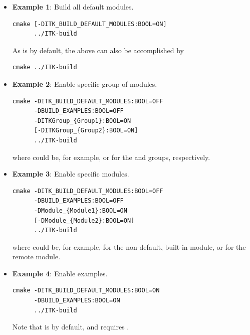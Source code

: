 \begin{itemize}
\item \textbf{Example 1}: Build all default modules.
\small
\begin{verbatim}
cmake [-DITK_BUILD_DEFAULT_MODULES:BOOL=ON]
      ../ITK-build
\end{verbatim}
\normalsize

As  is  by default, the above can
also be accomplished by
\begin{verbatim}
cmake ../ITK-build
\end{verbatim}

\item \textbf{Example 2}: Enable specific group of modules.
\small
\begin{verbatim}
cmake -DITK_BUILD_DEFAULT_MODULES:BOOL=OFF
      -DBUILD_EXAMPLES:BOOL=OFF
      -DITKGroup_{Group1}:BOOL=ON
      [-DITKGroup_{Group2}:BOOL=ON]
      ../ITK-build
\end{verbatim}
\normalsize

where  could be, for example,
 or  for the
 and  groups, respectively.

\item \textbf{Example 3}: Enable specific modules.
\small
\begin{verbatim}
cmake -DITK_BUILD_DEFAULT_MODULES:BOOL=OFF
      -DBUILD_EXAMPLES:BOOL=OFF
      -DModule_{Module1}:BOOL=ON
      [-DModule_{Module2}:BOOL=ON]
      ../ITK-build
\end{verbatim}
\normalsize

where  could be, for example,  for
the non-default, built-in  module, or  for
the  remote module.

\item \textbf{Example 4}: Enable examples.
\small
\begin{verbatim}
cmake -DITK_BUILD_DEFAULT_MODULES:BOOL=ON
      -DBUILD_EXAMPLES:BOOL=ON
      ../ITK-build
\end{verbatim}
\normalsize

Note that  is  by default, and
 requires .

\end{itemize}

